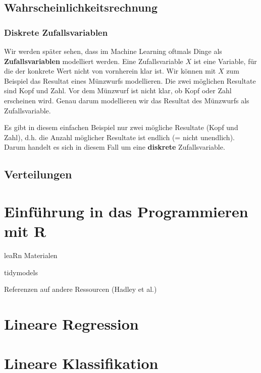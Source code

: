 \documentclass[
]{book}
\begin{document}
\hypertarget{wahrscheinlichkeitsrechnung}{%
\section{Wahrscheinlichkeitsrechnung}\label{wahrscheinlichkeitsrechnung}}

\hypertarget{diskrete-zufallsvariablen}{%
\subsection{Diskrete Zufallsvariablen}\label{diskrete-zufallsvariablen}}

Wir werden später sehen, dass im Machine Learning oftmals Dinge als \textbf{Zufallsvariablen} modelliert werden. Eine Zufallsvariable \(X\) ist eine Variable, für die der konkrete Wert nicht von vornherein klar ist. Wir können mit \(X\) zum Beispiel das Resultat eines Münzwurfs modellieren. Die zwei möglichen Resultate sind Kopf und Zahl. Vor dem Münzwurf ist nicht klar, ob Kopf oder Zahl erscheinen wird. Genau darum modellieren wir das Resultat des Münzwurfs als Zufallsvariable.

Es gibt in diesem einfachen Beispiel nur zwei mögliche Resultate (Kopf und Zahl), d.h. die Anzahl möglicher Resultate ist endlich (= nicht unendlich). Darum handelt es sich in diesem Fall um eine \textbf{diskrete} Zufallsvariable.

\hypertarget{verteilungen}{%
\section{Verteilungen}\label{verteilungen}}

\hypertarget{intro-R}{%
\chapter{Einführung in das Programmieren mit R}\label{intro-R}}

leaRn Materialen

tidymodels

Referenzen auf andere Ressourcen (Hadley et al.)

\hypertarget{lin-reg}{%
\chapter{Lineare Regression}\label{lin-reg}}

\hypertarget{lin-class}{%
\chapter{Lineare Klassifikation}\label{lin-class}}
\end{document}
